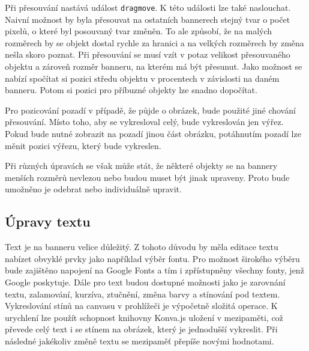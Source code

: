         Při přesouvání nastává událost \texttt{dragmove}. K této události lze také naslouchat. Naivní možnost by byla přesouvat na ostatních bannerech stejný tvar o počet pixelů,
        o které byl posouvaný tvar změněn. To ale způsobí, že na malých rozměrech by se objekt dostal rychle za hranici a na velkých rozměrech by
        změna nešla skoro poznat. Při přesouvání se musí vzít v potaz velikost přesouvaného objektu a zároveň rozměr banneru, na kterém má být přesunut.
        Jako možnost se nabízí spočítat si pozici středu objektu v procentech v závislosti na daném banneru.
        Potom si pozici pro příbuzné objekty lze snadno dopočítat.

        Pro pozicování pozadí v případě, že půjde o obrázek, bude použité jiné chování přesouvání. Místo toho, aby se vykresloval celý, bude vykreslován jen výřez.
        Pokud bude nutné zobrazit na pozadí jinou část obrázku, potáhnutím pozadí lze měnit pozici výřezu, který bude vykreslen.

        Při různých úpravách se však může stát, že některé objekty se na bannery menších rozměrů nevlezou nebo budou muset být jinak upraveny.
        Proto bude umožněno je odebrat nebo individuálně upravit.

        \subsection{Úpravy textu}
        Text je na banneru velice důležitý. Z tohoto důvodu by měla editace textu nabízet obvyklé prvky jako například výběr fontu.
        Pro možnost širokého výběru bude zajištěno napojení na Google Fonts a tím i zpřístupněny všechny fonty, jenž Google poskytuje.
        Dále pro text budou dostupné možnosti jako je zarovnání textu, zalamování, kurzíva, ztučnění, změna barvy a stínování pod textem.
        Vykreslování stínů na canvasu v prohlížeči je výpočetně složitá operace. K urychlení lze použít schopnost knihovny Konva.js uložení v mezipaměti,
        což převede celý text i se stínem na obrázek,
        který je jednodušší vykreslit. Při následné jakékoliv změně textu se mezipaměť přepíše novými hodnotami.

